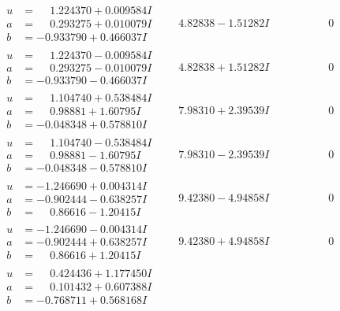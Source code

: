 \documentclass[1p]{elsarticle_modified}
\theoremstyle{definition}
\begin{document}
$$\begin{array}{c|c|c}
\begin{aligned}
u &= \phantom{-}1.224370 + 0.009584 I \\
a &= \phantom{-}0.293275 + 0.010079 I \\
b &= -0.933790 + 0.466037 I\end{aligned}
 & \phantom{-}4.82838 - 1.51282 I & \phantom{-0.000000 } 0 \\ \hline\begin{aligned}
u &= \phantom{-}1.224370 - 0.009584 I \\
a &= \phantom{-}0.293275 - 0.010079 I \\
b &= -0.933790 - 0.466037 I\end{aligned}
 & \phantom{-}4.82838 + 1.51282 I & \phantom{-0.000000 } 0 \\ \hline\begin{aligned}
u &= \phantom{-}1.104740 + 0.538484 I \\
a &= \phantom{-}0.98881 + 1.60795 I \\
b &= -0.048348 + 0.578810 I\end{aligned}
 & \phantom{-}7.98310 + 2.39539 I & \phantom{-0.000000 } 0 \\ \hline\begin{aligned}
u &= \phantom{-}1.104740 - 0.538484 I \\
a &= \phantom{-}0.98881 - 1.60795 I \\
b &= -0.048348 - 0.578810 I\end{aligned}
 & \phantom{-}7.98310 - 2.39539 I & \phantom{-0.000000 } 0 \\ \hline\begin{aligned}
u &= -1.246690 + 0.004314 I \\
a &= -0.902444 - 0.638257 I \\
b &= \phantom{-}0.86616 - 1.20415 I\end{aligned}
 & \phantom{-}9.42380 - 4.94858 I & \phantom{-0.000000 } 0 \\ \hline\begin{aligned}
u &= -1.246690 - 0.004314 I \\
a &= -0.902444 + 0.638257 I \\
b &= \phantom{-}0.86616 + 1.20415 I\end{aligned}
 & \phantom{-}9.42380 + 4.94858 I & \phantom{-0.000000 } 0 \\ \hline\begin{aligned}
u &= \phantom{-}0.424436 + 1.177450 I \\
a &= \phantom{-}0.101432 + 0.607388 I \\
b &= -0.768711 + 0.568168 I\end{aligned}

\end{array}$$
\end{document}
